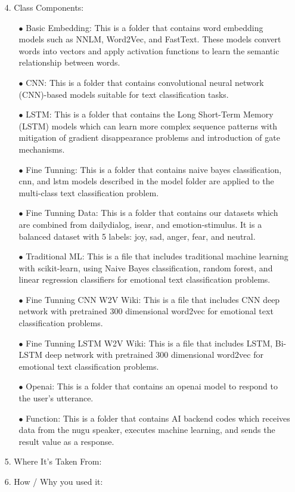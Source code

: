 \documentclass[conference]{IEEEtran}
\begin{document}
\begin{itemize}
\begin{table} [h]
\begin{tabular}{p{3cm}|p{3.5cm}|p{2cm}}
    \hline
    \end{tabular} 
\end{table}
    
    
    
    \item[4.]  Class Components: 
    \begin{itemize}
        \item[$\bullet$]Basic Embedding: This is a folder that contains word embedding models such as NNLM, Word2Vec, and FastText. These models convert words into vectors and apply activation functions to learn the semantic relationship between words.
        \item[$\bullet$]CNN: This is a folder that contains convolutional neural network (CNN)-based models suitable for text classification tasks.
        \item[$\bullet$]LSTM: This is a folder that contains the Long Short-Term Memory (LSTM) models which can learn more complex sequence patterns with mitigation of gradient disappearance problems and introduction of gate mechanisms.
        \item[$\bullet$]Fine Tunning: This is a folder that contains naive bayes classification, cnn, and lstm models described in the model folder are applied to the multi-class text classification problem.
        \item[$\bullet$]Fine Tunning Data: This is a folder that contains our datasets which are combined from dailydialog, isear, and emotion-stimulus. It is a balanced dataset with 5 labels: joy, sad, anger, fear, and neutral.
        \item[$\bullet$]Traditional ML: This is a file that includes traditional machine learning with scikit-learn, using Naive Bayes classification, random forest, and linear regression classifiers for emotional text classification problems.
        \item[$\bullet$]Fine Tunning CNN W2V Wiki: This is a file that includes CNN deep network with pretrained 300 dimensional word2vec for emotional text classification problems.
        \item[$\bullet$]Fine Tunning LSTM W2V Wiki: This is a file that includes LSTM, Bi-LSTM deep network with pretrained 300 dimensional word2vec for emotional text classification problems.
        \item[$\bullet$]Openai: This is a folder that contains an openai model to respond to the user's utterance.
        \item[$\bullet$]Function: This is a folder that contains AI backend codes which receives data from the nugu speaker, executes machine learning, and sends the result value as a response.



    \end{itemize}

    \item[5.] Where It's Taken From: 
\\ 
    \item[6.] How / Why you used it: 
\end{itemize}



 

\end{document}
